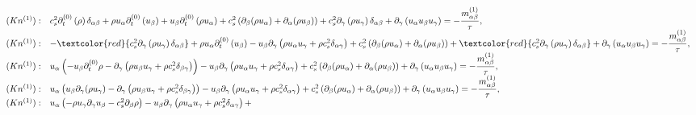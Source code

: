 \documentclass[letterpaper,10pt,english,openany,oneside]{jupyterBook}
\begin{document}
\begin{equation}
\begin{split}
\begin{array}{ll}
(Kn^{(1)}):& c_{s}^{2} \partial_{t}^{(0)}  \left(\rho\right) \delta_{\alpha\beta} + \rho u_{\alpha} \partial_{t}^{(0)} \left(u_{\beta} \right) + u_{\beta}\partial_{t}^{(0)}  \left(\rho u_{\alpha}\right) +  c_{s}^{2} \left(\partial_{\beta} (\rho u_{\alpha}) + \partial_{\alpha} (\rho u_{\beta}) \right) + c_{s}^{2} \partial_{\gamma} \left(\rho u_{\gamma} \right) \delta_{\alpha\beta} + \partial_{\gamma}\left( u_{\alpha} u_{\beta} u_{\gamma}\right) = - \displaystyle\frac{m^{(1)}_{\alpha\beta}}{\tau},\\
(Kn^{(1)}):& -\textcolor{red}{c_{s}^{2} \partial_{\gamma} \left( \rho u_{\gamma} \right)\delta_{\alpha\beta}} + 
            \rho u_{\alpha} \partial_{t}^{(0)} \left(u_{\beta} \right) - 
            u_{\beta} \partial_{\gamma} \left(\rho u_{\alpha}u_{\gamma} + \rho c_{s}^{2}\delta_{\alpha\gamma} \right) +  
            c_{s}^{2} \left(\partial_{\beta} (\rho u_{\alpha}) + \partial_{\alpha} (\rho u_{\beta}) \right) + 
            \textcolor{red}{c_{s}^{2} \partial_{\gamma} \left(\rho u_{\gamma} \right) \delta_{\alpha\beta}} + \partial_{\gamma}\left( u_{\alpha} u_{\beta} u_{\gamma}\right) = 
            - \displaystyle\frac{m^{(1)}_{\alpha\beta}}{\tau},\\
(Kn^{(1)}):& u_{\alpha} \left( -u_{\beta}\partial_{t}^{(0)} \rho  - \partial_{\gamma} \left(\rho u_{\beta}u_{\gamma} + \rho c_{s}^{2}\delta_{\beta\gamma} \right)\right) - 
            u_{\beta} \partial_{\gamma} \left(\rho u_{\alpha}u_{\gamma} + \rho c_{s}^{2}\delta_{\alpha\gamma} \right) +  
            c_{s}^{2} \left(\partial_{\beta} (\rho u_{\alpha}) + \partial_{\alpha} (\rho u_{\beta}) \right) 
            + \partial_{\gamma}\left( u_{\alpha} u_{\beta} u_{\gamma}\right) = 
            - \displaystyle\frac{m^{(1)}_{\alpha\beta}}{\tau},\\
(Kn^{(1)}):& u_{\alpha} \left( u_{\beta}\partial_{\gamma} (\rho u_{\gamma})  - \partial_{\gamma} \left(\rho u_{\beta}u_{\gamma} + \rho c_{s}^{2}\delta_{\beta\gamma} \right)\right) - 
            u_{\beta} \partial_{\gamma} \left(\rho u_{\alpha}u_{\gamma} + \rho c_{s}^{2}\delta_{\alpha\gamma} \right) +  
            c_{s}^{2} \left(\partial_{\beta} (\rho u_{\alpha}) + \partial_{\alpha} (\rho u_{\beta}) \right) 
            + \partial_{\gamma}\left( u_{\alpha} u_{\beta} u_{\gamma}\right) = 
            - \displaystyle\frac{m^{(1)}_{\alpha\beta}}{\tau},\\
(Kn^{(1)}):& u_{\alpha} \left( -\rho u_{\gamma}\partial_{\gamma} u_{\beta}  - c_{s}^{2}\partial_{\beta} \rho \right) - 
            u_{\beta} \partial_{\gamma} \left(\rho u_{\alpha}u_{\gamma} + \rho c_{s}^{2}\delta_{\alpha\gamma} \right) +  

\end{array}
\end{split}
\end{equation}
\end{document}
